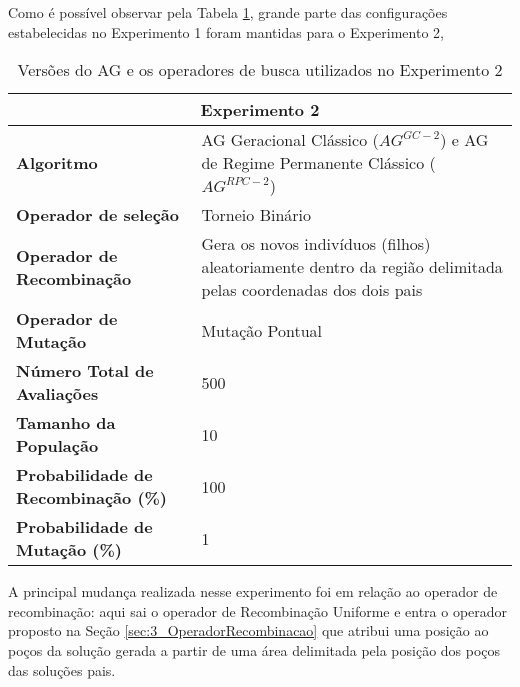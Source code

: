 Como é possível observar pela Tabela \ref{table:con02}, grande parte das configurações estabelecidas no Experimento 1 foram mantidas para o Experimento 2,

\begin{table}[!htbp]
\centering
\caption{Versões do AG e os operadores de busca utilizados no Experimento 2}
\label{table:con02}
\begin{tabular}{|p{6cm}|p{9cm}|}
\hline
\multicolumn{2}{|c|}{\textbf{Experimento 2}} \\ \hline
{\textbf{Algoritmo}} & AG Geracional Clássico ($AG^{GC-2}$) e AG de Regime Permanente Clássico ($AG^{RPC-2}$) \\ \hline
\textbf{Operador de seleção} & Torneio Binário \\ \hline
\textbf{Operador de Recombinação} & Gera os novos indivíduos (filhos) aleatoriamente dentro da região delimitada pelas coordenadas dos dois pais \\  \hline
\textbf{Operador de Mutação} & Mutação Pontual \\ \hline
\textbf{Número Total de Avaliações} & 500 \\ \hline
\textbf{Tamanho da População} & 10 \\ \hline
\textbf{Probabilidade de Recombinação (\%)} & 100 \\ \hline
\textbf{Probabilidade de Mutação (\%)} & 1 \\ \hline
\end{tabular}
\end{table}

A principal mudança realizada nesse experimento foi em relação ao operador de recombinação: aqui sai o operador de  Recombinação Uniforme e entra o operador proposto na Seção \ref{sec:3_OperadorRecombinacao} que atribui uma posição ao poços da solução gerada a partir de uma área delimitada pela posição dos poços das soluções pais.

